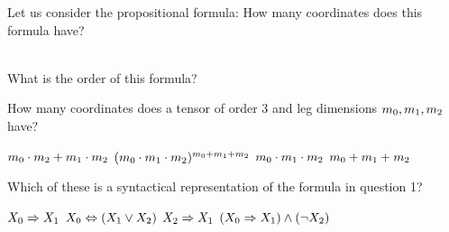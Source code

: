 \documentclass[answers,12pt]{exam}
\begin{document}
    \begin{questions}

        \question Let us consider the propositional formula:
        How many coordinates does this formula have? \\
        \begin{oneparcheckboxes}
        \end{oneparcheckboxes}\\
        What is the order of this formula? \\
        \begin{oneparcheckboxes}
        \end{oneparcheckboxes}

        \question
        How many coordinates does a tensor of order $3$ and leg dimensions $m_{0},m_{1},m_{2}$ have? \\
        \begin{oneparcheckboxes}
            \choice $m_{0}\cdot m_{2}+m_{1}\cdot m_{2}$
            \choice $(m_{0}\cdot m_{1}\cdot m_{2})^{m_{0}+m_{1}+m_{2}}$
            \correctchoice $m_{0}\cdot m_{1}\cdot m_{2}$
            \choice $m_{0}+m_{1}+m_{2}$
        \end{oneparcheckboxes}

        \question
        Which of these is a syntactical representation of the formula in question 1? \\
        \begin{oneparcheckboxes}
            \choice $X_{0}\Rightarrow X_{1}$
            \choice $X_{0}\Leftrightarrow (X_{1}\lor X_{2})$
            \choice $X_{2}\Rightarrow X_{1}$
            \correctchoice $(X_{0}\Rightarrow X_{1})\land(\lnot X_{2})$
        \end{oneparcheckboxes}


\end{questions}
\end{document}
